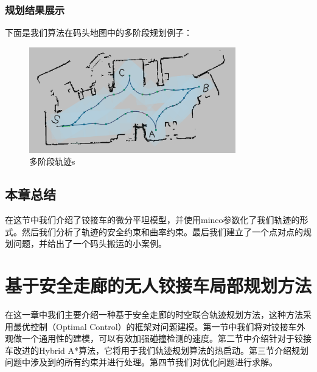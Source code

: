 \documentclass[master,academic]{ysuthesis} %
\begin{document}
		\subsection{规划结果展示}
		下面是我们算法在码头地图中的多阶段规划例子：
		\begin{figure}[!ht]
			\centering
			\includegraphics[width=0.8\textwidth]{多阶段轨迹s.png}
			\caption{多阶段轨迹s}
			\label{fig:多阶段轨迹s}
		\end{figure}
	\section{本章总结}
	在这节中我们介绍了铰接车的微分平坦模型，并使用minco参数化了我们轨迹的形式。然后我们分析了轨迹的安全约束和曲率约束。最后我们建立了一个点对点的规划问题，并给出了一个码头搬运的小案例。
	
	
	\chapter{基于安全走廊的无人铰接车局部规划方法}
	在这一章中我们主要介绍一种基于安全走廊的时空联合轨迹规划方法，这种方法采用最优控制（Optimal Control）的框架对问题建模。第一节中我们将对铰接车外观做一个通用性的建模，可以有效加强碰撞检测的速度。第二节中介绍针对于铰接车改进的Hybrid A*算法，它将用于我们轨迹规划算法的热启动。第三节介绍规划问题中涉及到的所有约束并进行处理。第四节我们对优化问题进行求解。
\end{document}
